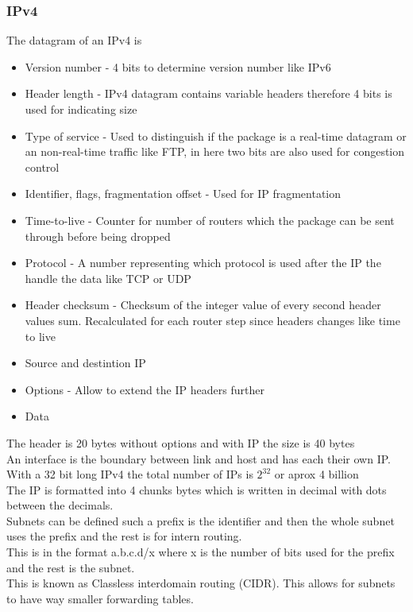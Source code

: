 \documentclass[12pt, a4paper]{article}
\begin{document}
			\subsubsection{IPv4}
				The datagram of an IPv4 is
				\begin{itemize}
					\item Version number - 4 bits to determine version number like IPv6
					\item Header length - IPv4 datagram contains variable headers therefore 4 bits is used for indicating size
					\item Type of service - Used to distinguish if the package is a real-time datagram or an non-real-time traffic like FTP, in here two bits are also used for congestion control
					\item Identifier, flags, fragmentation offset - Used for IP fragmentation 
					\item Time-to-live - Counter for number of routers which the package can be sent through before being dropped
					\item Protocol - A number representing which protocol is used after the IP the handle the data like TCP or UDP
					\item Header checksum - Checksum of the integer value of every second header values sum. Recalculated for each router step since headers changes like time to live
					\item Source and destintion IP
					\item Options - Allow to extend the IP headers further
					\item Data
				\end{itemize}
				The header is 20 bytes without options and with IP the size is 40 bytes\\
				An interface is the boundary between link and host and has each their own IP.\\
				With a 32 bit long IPv4 the total number of IPs is $2^{32}$ or aprox 4 billion\\
				The IP is formatted into 4 chunks bytes which is written in decimal with dots between the decimals.\\
				Subnets can be defined such a prefix is the identifier and then the whole subnet uses the prefix and the rest is for intern routing.\\
				This is in the format a.b.c.d/x where x is the number of bits used for the prefix and the rest is the subnet.\\
				This is known as Classless interdomain routing (CIDR). This allows for subnets to have way smaller forwarding tables.\\
\end{document}
